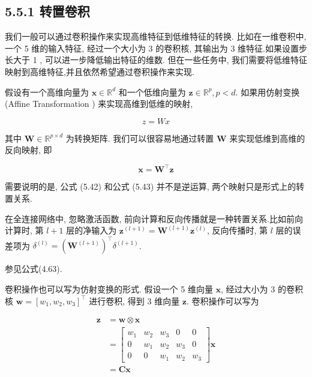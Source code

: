 \documentclass[10pt]{article}
\begin{document}
\subsection*{5.5.1 转置卷积}
我们一般可以通过卷积操作来实现高维特征到低维特征的转换. 比如在一维卷积中, 一个 5 维的输入特征, 经过一个大小为 3 的卷积核, 其输出为 3 维特征.如果设置步长大于 1 , 可以进一步降低输出特征的维数. 但在一些任务中, 我们需要将低维特征映射到高维特征,并且依然希望通过卷积操作来实现.

假设有一个高维向量为 $\boldsymbol{x} \in \mathbb{R}^{d}$ 和一个低维向量为 $\boldsymbol{z} \in \mathbb{R}^{p}, p<d$. 如果用仿射变换 (Affine Transformation ) 来实现高维到低维的映射,


\begin{equation*}
z=W x \tag{5.42}
\end{equation*}


其中 $\boldsymbol{W} \in \mathbb{R}^{p \times d}$ 为转换矩阵. 我们可以很容易地通过转置 $\boldsymbol{W}$ 来实现低维到高维的反向映射, 即


\begin{equation*}
\boldsymbol{x}=\boldsymbol{W}^{\top} \boldsymbol{z} \tag{5.43}
\end{equation*}


需要说明的是, 公式 (5.42) 和公式 (5.43) 并不是逆运算, 两个映射只是形式上的转置关系.

在全连接网络中, 忽略激活函数, 前向计算和反向传播就是一种转置关系.比如前向计算时, 第 $l+1$ 层的净输入为 $\boldsymbol{z}^{(l+1)}=\boldsymbol{W}^{(l+1)} \boldsymbol{z}^{(l)}$, 反向传播时, 第 $l$ 层的误差项为 $\delta^{(l)}=\left(\boldsymbol{W}^{(l+1)}\right)^{\top} \delta^{(l+1)}$.

参见公式(4.63).

卷积操作也可以写为仿射变换的形式. 假设一个 5 维向量 $\boldsymbol{x}$, 经过大小为 3 的卷积核 $\boldsymbol{w}=\left[w_{1}, w_{2}, w_{3}\right]^{\top}$ 进行卷积, 得到 3 维向量 $\boldsymbol{z}$. 卷积操作可以写为


\begin{align*}
\boldsymbol{z} & =\boldsymbol{w} \otimes \boldsymbol{x}  \tag{5.44}\\
& =\left[\begin{array}{lllll}
w_{1} & w_{2} & w_{3} & 0 & 0 \\
0 & w_{1} & w_{2} & w_{3} & 0 \\
0 & 0 & w_{1} & w_{2} & w_{3}
\end{array}\right] \boldsymbol{x}  \tag{5.45}\\
& =\boldsymbol{C} \boldsymbol{x} \tag{5.46}
\end{align*}
\end{document}
